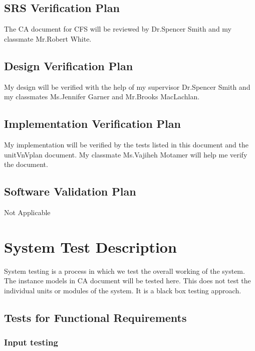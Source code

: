 \documentclass[12pt, titlepage]{article}
\newcommand{\famname}{CFS} %
\begin{document}
\subsection{SRS Verification Plan}

The CA document for \famname{} will be reviewed by Dr.Spencer Smith and my classmate Mr.Robert White.

\subsection{Design Verification Plan}

My design will be verified with the help of my supervisor Dr.Spencer Smith and my classmates Ms.Jennifer Garner and Mr.Brooks MacLachlan.

\subsection{Implementation Verification Plan}


My implementation will be verified by the tests listed in this document and the unitVnVplan document. My classmate Ms.Vajiheh Motamer will help me verify the document.	

\subsection{Software Validation Plan}

Not Applicable

\section{System Test Description}

System testing is a process in which we test the overall working of the system. The instance models in CA document will be tested here. This does not test the individual units or modules of the system. It is a black box testing approach.
	
\subsection{Tests for Functional Requirements}

\subsubsection{Input testing}
\end{document}
